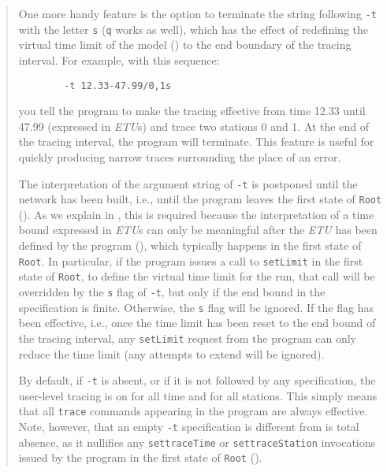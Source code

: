 \begin{quote}
One more handy feature is the option
to terminate the string following {\tt -t} with the letter
{\tt s} ({\tt q} works as well), which has the effect of redefining the
virtual time limit of the model ()
to the end boundary of the tracing interval.
For example, with this sequence:
\begin{verbatim}
        -t 12.33-47.99/0,1s
\end{verbatim}
\noindent
you tell the program to make the tracing effective from time 12.33 until
47.99 (expressed in {\em ETU\/}s) and trace two stations 0 and 1.
At the end of the tracing interval, the program will terminate.
This feature is useful for quickly producing narrow traces surrounding the
place of an error.

The interpretation of the argument string of {\tt -t} is postponed until
the network has been built, i.e., until the program leaves the first state
of {\tt Root} ().
As we explain in ,
this is required because the
interpretation of a time bound expressed in {\em ETU\/}s
can only be meaningful after the {\em ETU\/} has been defined by the program
(), which typically happens in the first state of {\tt Root}.
In particular, if the program issues a call to {\tt setLimit} in the
first state of {\tt Root}, to define the virtual time limit for the run,
that call will be overridden by the {\tt s} flag of {\tt -t},
but only if the end bound in the specification is finite.
Otherwise, the {\tt s} flag will be ignored.
If the flag has been effective, i.e., once the time limit has been reset to the
end bound of the tracing interval, any {\tt setLimit} request from the
program can only reduce the time limit (any attempts to extend will be ignored).

By default, if {\tt -t} is absent, or if it is not followed by any
specification, the user-level tracing is on for all time and for all stations.
This simply means that all {\tt trace} commands appearing in the program
are always effective.
Note, however, that an empty {\tt -t} specification is different from is
total absence, as it nullifies any {\tt settraceTime} or
{\tt settraceStation} invocations issued by the program in the first
state of {\tt Root} ().
\end{quote}

